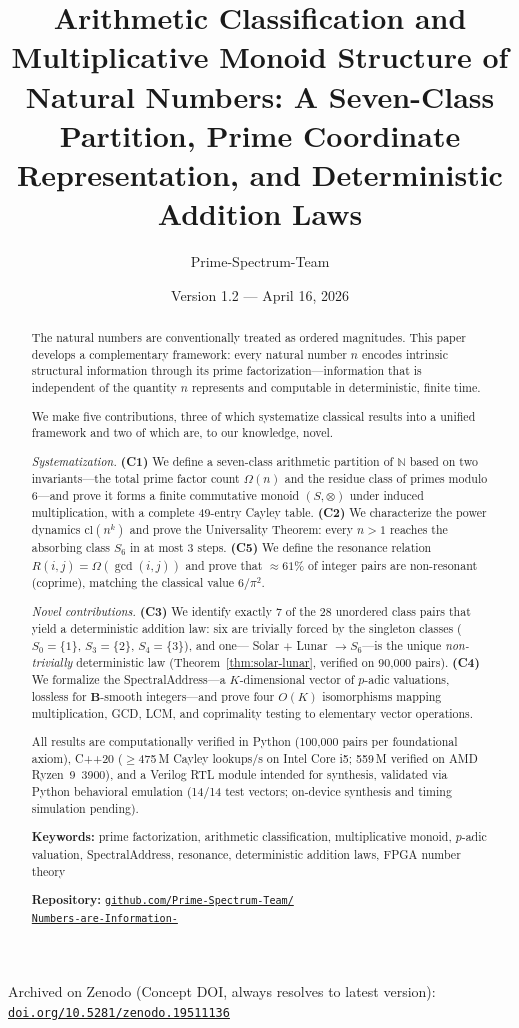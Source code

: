 \documentclass[10pt,twocolumn]{article}
\title{\textbf{Arithmetic Classification and Multiplicative Monoid
Structure of Natural Numbers: A Seven-Class Partition, Prime Coordinate
Representation, and Deterministic Addition Laws}}
\author{Prime-Spectrum-Team}
\date{Version 1.2 --- April 16, 2026}
\newcommand{\cl}{\mathrm{cl}}
\newcommand{\Om}{\Omega}
\newcommand{\B}{\mathbf{B}}
\newcommand{\N}{\mathbb{N}}
\newcommand{\repourl}{%
  \href{https://github.com/Prime-Spectrum-Team/Numbers-are-Information-.git}%
       {\small\texttt{github.com/Prime-Spectrum-Team/}\\\texttt{Numbers-are-Information-}}%
}
\begin{document}
\maketitle

\begin{center}
\small
Archived on Zenodo (Concept DOI, always resolves to latest version):\\
\href{https://doi.org/10.5281/zenodo.19511136}{\texttt{doi.org/10.5281/zenodo.19511136}}
\end{center}

\begin{abstract}
The natural numbers are conventionally treated as ordered magnitudes.
This paper develops a complementary framework: every natural number $n$
encodes intrinsic structural information through its prime
factorization---information that is independent of the quantity $n$
represents and computable in deterministic, finite time.

We make five contributions, three of which systematize classical results
into a unified framework and two of which are, to our knowledge, novel.

\emph{Systematization.}
\textbf{(C1)} We define a seven-class arithmetic partition of $\N$ based
on two invariants---the total prime factor count $\Om(n)$ and the residue
class of primes modulo 6---and prove it forms a finite commutative monoid
$(S, \otimes)$ under induced multiplication, with a complete 49-entry
Cayley table.
\textbf{(C2)} We characterize the power dynamics $\cl(n^k)$ and prove the
Universality Theorem: every $n > 1$ reaches the absorbing class $S_6$ in
at most 3 steps.
\textbf{(C5)} We define the resonance relation $R(i,j) = \Om(\gcd(i,j))$
and prove that $\approx 61\%$ of integer pairs are non-resonant (coprime),
matching the classical value $6/\pi^2$.

\emph{Novel contributions.}
\textbf{(C3)} We identify exactly 7 of the 28 unordered class pairs that
yield a deterministic addition law: six are trivially forced by the
singleton classes ($S_0=\{1\}$, $S_3=\{2\}$, $S_4=\{3\}$), and one---
Solar $+$ Lunar $\to S_6$---is the unique \emph{non-trivially}
deterministic law (Theorem~\ref{thm:solar-lunar}, verified on 90{,}000 pairs).
\textbf{(C4)} We formalize the SpectralAddress---a $K$-dimensional vector
of $p$-adic valuations, lossless for $\B$-smooth integers---and prove four
$O(K)$ isomorphisms mapping multiplication, GCD, LCM, and coprimality
testing to elementary vector operations.

All results are computationally verified in Python (100{,}000 pairs per
foundational axiom), C++20 ($\geq$475\,M Cayley lookups/s on Intel Core
i5; 559\,M verified on AMD Ryzen~9~3900), and a Verilog RTL
module intended for synthesis, validated via Python behavioral emulation
(14/14 test vectors; on-device synthesis and timing simulation pending).

\smallskip
\noindent\textbf{Keywords:} prime factorization, arithmetic
classification, multiplicative monoid, $p$-adic valuation,
SpectralAddress, resonance, deterministic addition laws, FPGA number
theory

\smallskip
\noindent\textbf{Repository:} \repourl
\end{abstract}
\end{document}
